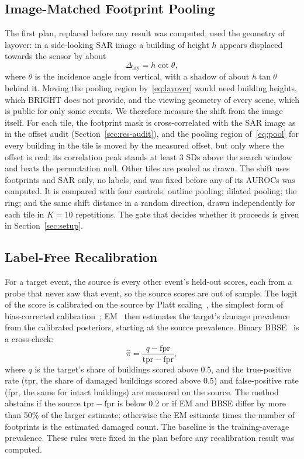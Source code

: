 \documentclass{ieeeaccess}
\begin{document}
\subsection{Image-Matched Footprint Pooling}
\label{sec:c2}
The first plan, replaced before any result was computed, used the geometry of layover: in a side-looking SAR image a building of height $h$ appears displaced towards the sensor by about
\begin{equation}
\Delta_{\mathrm{lay}}=h\cot\theta,
\label{eq:layover}
\end{equation}
where $\theta$ is the incidence angle from vertical, with a shadow of about $h\tan\theta$ behind it. Moving the pooling region by~\eqref{eq:layover} would need building heights, which BRIGHT does not provide, and the viewing geometry of every scene, which is public for only some events. We therefore measure the shift from the image itself. For each tile, the footprint mask is cross-correlated with the SAR image as in the offset audit (Section~\ref{sec:res-audit}), and the pooling region of~\eqref{eq:pool} for every building in the tile is moved by the measured offset, but only where the offset is real: its correlation peak stands at least 3 SDs above the search window and beats the permutation null. Other tiles are pooled as drawn. The shift uses footprints and SAR only, no labels, and was fixed before any of its AUROCs was computed. It is compared with four controls: outline pooling; dilated pooling; the ring; and the same shift distance in a random direction, drawn independently for each tile in $K=10$ repetitions. The gate that decides whether it proceeds is given in Section~\ref{sec:setup}.

\subsection{Label-Free Recalibration}
For a target event, the source is every other event's held-out scores, each from a probe that never saw that event, so the source scores are out of sample. The logit of the score is calibrated on the source by Platt scaling~\cite{platt1999probabilistic}, the simplest form of bias-corrected calibration~\cite{alexandari2020bcts}; EM~\cite{saerens2002adjusting} then estimates the target's damage prevalence from the calibrated posteriors, starting at the source prevalence. Binary BBSE~\cite{lipton2018bbse} is a cross-check:
\begin{equation}
\hat\pi=\frac{q-\mathrm{fpr}}{\mathrm{tpr}-\mathrm{fpr}},
\label{eq:bbse}
\end{equation}
where $q$ is the target's share of buildings scored above 0.5, and the true-positive rate (tpr, the share of damaged buildings scored above 0.5) and false-positive rate (fpr, the same for intact buildings) are measured on the source. The method abstains if the source $\mathrm{tpr}-\mathrm{fpr}$ is below 0.2 or if EM and BBSE differ by more than 50\% of the larger estimate; otherwise the EM estimate times the number of footprints is the estimated damaged count. The baseline is the training-average prevalence. These rules were fixed in the plan before any recalibration result was computed.
\end{document}
